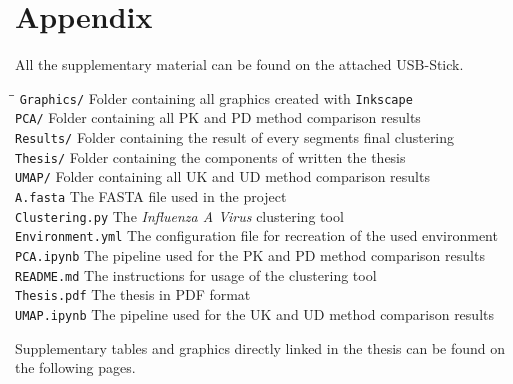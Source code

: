 \chapter{Appendix}  \label{chap:Appendix}

All the supplementary material can be found on the attached USB-Stick.

\begin{tabbing}
    \hspace{4cm}\=\=\kill
    \texttt{Graphics/} \> Folder containing all graphics created with \texttt{Inkscape}\\
    \texttt{PCA/} \> Folder containing all PK and PD method comparison results\\
    \texttt{Results/} \> Folder containing the result of every segments final clustering\\
    \texttt{Thesis/} \> Folder containing the components of written the thesis\\
    \texttt{UMAP/} \> Folder containing all UK and UD method comparison results\\
    \texttt{A.fasta} \> The FASTA file used in the project\\
    \texttt{Clustering.py} \> The \textit{Influenza A Virus} clustering tool\\
    \texttt{Environment.yml} \> The configuration file for recreation of the used environment\\
    \texttt{PCA.ipynb} \> The pipeline used for the PK and PD method comparison results\\
    \texttt{README.md} \> The instructions for usage of the clustering tool\\
    \texttt{Thesis.pdf} \> The thesis in PDF format\\
    \texttt{UMAP.ipynb} \> The pipeline used for the UK and UD method comparison results\\
\end{tabbing}

Supplementary tables and graphics directly linked in the thesis can be found on the following pages.


